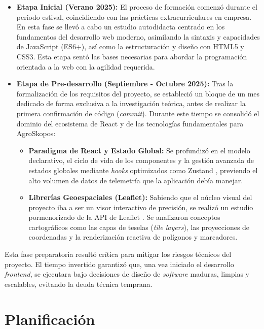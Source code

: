 \begin{itemize}
    \item \textbf{Etapa Inicial (Verano 2025):} El proceso de formación comenzó durante el periodo estival, coincidiendo con las prácticas extracurriculares en empresa. En esta fase se llevó a cabo un estudio autodidacta centrado en los fundamentos del desarrollo web moderno, asimilando la sintaxis y capacidades de JavaScript (ES6+), así como la estructuración y diseño con HTML5 y CSS3. Esta etapa sentó las bases necesarias para abordar la programación orientada a la web con la agilidad requerida.
    \item \textbf{Etapa de Pre-desarrollo (Septiembre - Octubre 2025):} Tras la formalización de los requisitos del proyecto, se estableció un bloque de un mes dedicado de forma exclusiva a la investigación teórica, antes de realizar la primera confirmación de código (\textit{commit}). Durante este tiempo se consolidó el dominio del ecosistema de React \cite{react} y de las tecnologías fundamentales para AgroSkopos:
    \begin{itemize}
        \item \textbf{Paradigma de React y Estado Global:} Se profundizó en el modelo declarativo, el ciclo de vida de los componentes y la gestión avanzada de estados globales mediante \textit{hooks} optimizados como Zustand \cite{zustand}, previendo el alto volumen de datos de telemetría que la aplicación debía manejar.
        \item \textbf{Librerías Geoespaciales (Leaflet):} Sabiendo que el núcleo visual del proyecto iba a ser un visor interactivo de precisión, se realizó un estudio pormenorizado de la API de Leaflet \cite{leaflet}. Se analizaron conceptos cartográficos como las capas de teselas (\textit{tile layers}), las proyecciones de coordenadas y la renderización reactiva de polígonos y marcadores.
    \end{itemize}
\end{itemize}

Esta fase preparatoria resultó crítica para mitigar los riesgos técnicos del proyecto. El tiempo invertido garantizó que, una vez iniciado el desarrollo \textit{frontend}, se ejecutara bajo decisiones de diseño de \textit{software} maduras, limpias y escalables, evitando la deuda técnica temprana.

\section{Planificación}

